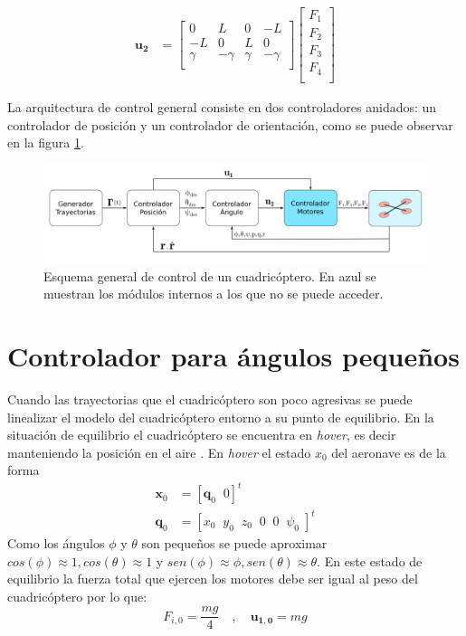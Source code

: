 \begin{align}
	\mathbf{u_2}  &= \begin{bmatrix}
		0&L&0&-L\\
		-L&0&L&0\\
		\gamma&-\gamma&\gamma&-\gamma\\
	\end{bmatrix}\begin{bmatrix} F_1\\ 
	F_2\\ 
	F_3\\ 
	F_4\\ 
\end{bmatrix}\label{eq:u2}
\end{align} 

La arquitectura de control general consiste en dos controladores anidados: un controlador de posición y un controlador de orientación, como se puede observar en la figura \ref{control:1}.



\begin{figure}[htb!]
	\centering
	\includegraphics[width=\textwidth]{imagenes/diagramaControl1}
	\caption{Esquema general de control de un cuadricóptero. En azul se muestran los módulos internos a los que no se puede acceder. }
	\label{control:1}
\end{figure}


\section{Controlador para ángulos pequeños}
Cuando las trayectorias que el cuadricóptero son poco agresivas se puede linealizar el modelo del cuadricóptero entorno a su punto de equilibrio. En la situación de equilibrio el cuadricóptero se encuentra en \textit{hover}, es decir manteniendo la posición en el aire . En \textit{hover} el estado $x_0$ del aeronave es de la forma 
\begin{align}
	\mathbf{x}_0 &= [\mathbf{q}_0 \;\; 0]^t\nonumber\\
	\mathbf{q}_0 &= [x_0  \;\;y_0  \;\;z_0  \;\;0  \;\;0  \;\;\psi_0  \;]^t
\end{align}
Como los ángulos $\phi$ y $\theta$ son pequeños se puede aproximar $cos(\phi) \approx 1 , cos(\theta) \approx 1$ y $sen(\phi) \approx \phi , sen(\theta) \approx \theta$. En este estado de equilibrio la fuerza total que ejercen los motores debe ser igual al peso del cuadricóptero por lo que:
\begin{equation}
	F_{i,0}  = \frac{mg}{4}\quad,\quad \mathbf{u_{1,0}} = mg
\end{equation}

